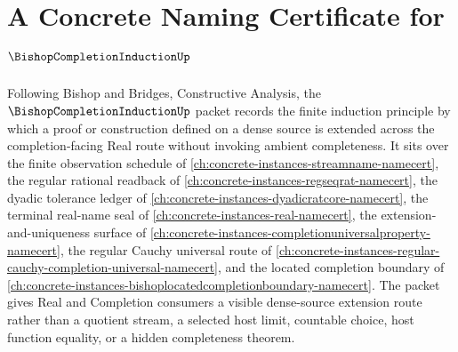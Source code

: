 \chapter{A Concrete Naming Certificate for $\BishopCompletionInductionUp$}
\label{ch:concrete-instances-bishop-completion-induction-namecert}

Following Bishop and Bridges, Constructive Analysis, the $\BishopCompletionInductionUp$ packet records the finite induction principle by which a proof or construction defined on a dense source is extended across the completion-facing Real route without invoking ambient completeness. It sits over the finite observation schedule of \autoref{ch:concrete-instances-streamname-namecert}, the regular rational readback of \autoref{ch:concrete-instances-regseqrat-namecert}, the dyadic tolerance ledger of \autoref{ch:concrete-instances-dyadicratcore-namecert}, the terminal real-name seal of \autoref{ch:concrete-instances-real-namecert}, the extension-and-uniqueness surface of \autoref{ch:concrete-instances-completionuniversalproperty-namecert}, the regular Cauchy universal route of \autoref{ch:concrete-instances-regular-cauchy-completion-universal-namecert}, and the located completion boundary of \autoref{ch:concrete-instances-bishoplocatedcompletionboundary-namecert}. The packet gives Real and Completion consumers a visible dense-source extension route rather than a quotient stream, a selected host limit, countable choice, host function equality, or a hidden completeness theorem.

